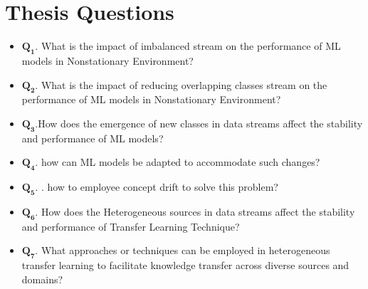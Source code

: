 \section{Thesis Questions}
\label{sec:1_introduction_questions}

\begin{itemize}[nosep]
    \setlength{\itemindent}{-.5in}
       \item $\pmb{Q_1}$. What is the impact of imbalanced stream on the performance of ML models in Nonstationary Environment?
        \item $\pmb{Q_2}$. What is the impact of reducing overlapping classes stream on the performance of ML models in Nonstationary Environment?
        \item $\pmb{Q_3}$.How does the emergence of new classes in data streams affect the stability and performance of ML models?
        \item $\pmb{Q_4}$. how can ML models be adapted to accommodate such changes?
        \item $\pmb{Q_5}$. . how to employee concept drift to solve this problem?
        \item $\pmb{Q_6}$. How does the Heterogeneous sources in data streams affect the stability and performance of Transfer Learning Technique?
        \item $\pmb{Q_7}$. What approaches or techniques can be employed in heterogeneous transfer learning to facilitate knowledge transfer across diverse sources and domains?
    \end{itemize}
    